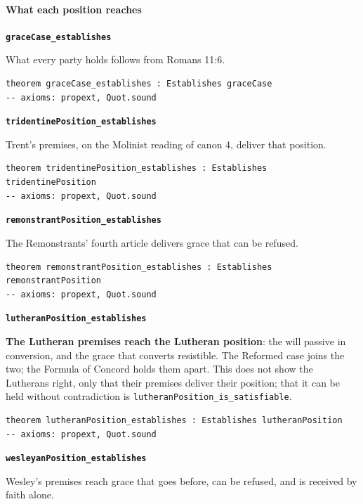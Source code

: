 \documentclass[11pt]{article}
\begin{document}
\paragraph*{What each position reaches}
\leavevmode\par\nobreak
\par\medskip\noindent\textbf{\texttt{grace\allowbreak{}Case\_\allowbreak{}establishes}}\par\nobreak\noindent
What every party holds follows from Romans 11:6.

{\small\begin{verbatim}
theorem graceCase_establishes : Establishes graceCase
-- axioms: propext, Quot.sound
\end{verbatim}}
\par\medskip\noindent\textbf{\texttt{tridentine\allowbreak{}Position\_\allowbreak{}establishes}}\par\nobreak\noindent
Trent’s premises, on the Molinist reading of canon 4, deliver that position.

{\small\begin{verbatim}
theorem tridentinePosition_establishes : Establishes tridentinePosition
-- axioms: propext, Quot.sound
\end{verbatim}}
\par\medskip\noindent\textbf{\texttt{remonstrant\allowbreak{}Position\_\allowbreak{}establishes}}\par\nobreak\noindent
The Remonstrants’ fourth article delivers grace that can be refused.

{\small\begin{verbatim}
theorem remonstrantPosition_establishes : Establishes remonstrantPosition
-- axioms: propext, Quot.sound
\end{verbatim}}
\par\medskip\noindent\textbf{\texttt{lutheran\allowbreak{}Position\_\allowbreak{}establishes}}\par\nobreak\noindent
\textbf{The Lutheran premises reach the Lutheran position}: the will passive in conversion, and the grace that converts resistible. The Reformed case joins the two; the Formula of Concord holds them apart. This does not show the Lutherans right, only that their premises deliver their position; that it can be held without contradiction is \texttt{lutheran\allowbreak{}Position\_\allowbreak{}is\_\allowbreak{}satisfiable}.

{\small\begin{verbatim}
theorem lutheranPosition_establishes : Establishes lutheranPosition
-- axioms: propext, Quot.sound
\end{verbatim}}
\par\medskip\noindent\textbf{\texttt{wesleyan\allowbreak{}Position\_\allowbreak{}establishes}}\par\nobreak\noindent
Wesley’s premises reach grace that goes before, can be refused, and is received by faith alone.
\end{document}
